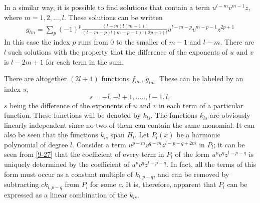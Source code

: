 In a similar way, it is possible to find solutions that contain a term $u^{l-m}v^{m-1}z$, where $m = 1,2, \dots, l$. These solutions can be written
  \begin{multline}
    g_{lm} = \sum_{p}(-1)^{p} \frac{(l-m)!(m-1)!}{(l-m-p)!(m-p-1)!(2p+1)!} u^{l-m-p} v^{m-p-1} z^{2p+1}
  \label{9-29}
  \end{multline}
In this case the index $p$ runs from 0 to the smaller of $m- 1$ and $l- m$. There are $l$ such solutions with the property that the difference of the exponents of $u$ and $v$ is $l-2m + 1$ for each term in the sum.

There are altogether $(2l + 1)$ functions $f_{lm}$, $g_{lm}$. These can be labeled by an index $s$, 
$$s = -l, -l + 1, ..\dots, l- 1, l,$$
$s$ being the difference of the exponents of $u$ and $v$ in each term of a particular function. These functions will be denoted by $k_{ls}$. The functions $k_{ls}$ are obviously linearly independent since no two of them can contain the same monomial. It can also be seen that the functions $k_{ls}$ span $H_{l}$. Let $P_{l}(x)$ be a harmonic polynomial of degree $l$. Consider a term $u^{p-m}v^{q-m}z^{l-p-q+2m}$ in $P_{l}$; it can be seen from \eqref{9-27} that the coefficient of every term in $P_{l}$ of the form $u^{p}v^{q}z^{l-p-q}$ is uniquely determined by the coefficient of $u^{p}v^{q}z^{l-p-q}$. In fact, all the terms of this form must occur as a constant multiple of $k_{l,p-q}$, and can be removed by subtracting $ck_{l,p-q}$ from $P_{l}$ for some $c$. It is, therefore, apparent that $P_{l}$ can be expressed as a linear combination of the $k_{ls}$.

